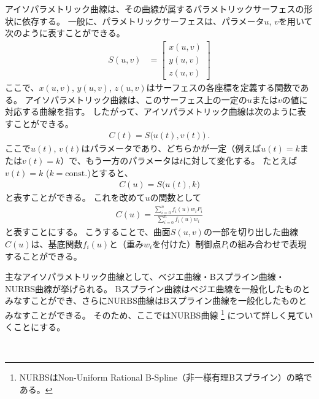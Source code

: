 


アイソパラメトリック曲線は、その曲線が属するパラメトリックサーフェスの形状に依存する。
一般に、パラメトリックサーフェスは、パラメータ$u$, $v$を用いて次のように表すことができる。
\begin{align*}
  S(u, v) &=
  \left[
  \begin{array}{c}
    x(u, v)\\
    y(u, v)\\
    z(u, v)
  \end{array}
  \right]
\end{align*}
ここで、$x(u,v)$, $y(u,v)$, $z(u,v)$はサーフェスの各座標を定義する関数である。
アイソパラメトリック曲線は、このサーフェス上の一定の$u$または$v$の値に対応する曲線を指す。
したがって、アイソパラメトリック曲線は次のように表すことができる。
\begin{align*}
  C(t) = S\big(u(t), v(t)\big)\ .
\end{align*}
ここで$u(t)$, $v(t)$はパラメータであり、どちらかが一定（例えば$u(t)=k$または$v(t)=k$）で、もう一方のパラメータは$t$に対して変化する。
たとえば$v(t) = k$ ($k = \text{const.}$)とすると、
\begin{align*}
  C(u) = S\big(u(t), k\big)
\end{align*}
と表すことができる。
これを改めて$u$の関数として
\begin{align*}
  C(u) = \frac{\displaystyle\sum_{i=0}^nf_i(u)w_iP_i}{\displaystyle\sum_{i=0}^nf_i(u)w_i}
\end{align*}
と表すことにする。
こうすることで、曲面$S(u, v)$の一部を切り出した曲線$C(u)$は、基底関数$f_i(u)$と（重み$w_i$を付けた）制御点$P_i$の組み合わせで表現することができる。

主なアイソパラメトリック曲線として、ベジエ曲線・Bスプライン曲線・NURBS曲線が挙げられる。
Bスプライン曲線はベジエ曲線を一般化したものとみなすことができ、さらにNURBS曲線はBスプライン曲線を一般化したものとみなすことができる。
そのため、ここではNURBS曲線
\footnote{NURBSはNon-Uniform Rational B-Spline（非一様有理Bスプライン）の略である。
}
について詳しく見ていくことにする。


\clearpage
~